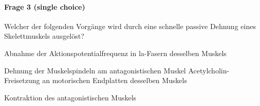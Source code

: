 \paragraph{Frage 3 (single choice)}

Welcher der folgenden Vorgänge wird durch eine schnelle passive Dehnung eines Skelettmuskels ausgelöst?
\begin{benumerate}
  \item Abnahme der Aktionspotentialfrequenz in la-Fasern desselben Muskels
  \item Dehnung der Muskelspindeln am antagonistischen Muskel
  \bolditem Acetylcholin-Freisetzung an motorischen Endplatten desselben Muskels
  \item Kontraktion des antagonistischen Muskels
\end{benumerate}